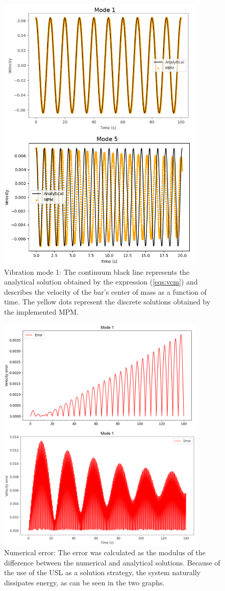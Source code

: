 \documentclass[preprint,12pt]{elsarticle}
\begin{document}
    \begin{figure}
    	\includegraphics[width=10cm]{results.png}
    	\centering
    	\caption{Vibration mode 1: The continuum black line represents the analytical solution obtained by the expression (\ref{eqs:vcm}) and describes the velocity of the bar's center of mass as a function of time. The yellow dots represent the discrete solutions obtained by the implemented MPM.}
    	\label{fig:results}
    \end{figure}
    
    \begin{figure}
    	\includegraphics[width=10cm]{error.png}
    	\centering
    	\caption{Numerical error: The error was calculated as the modulus of the difference between the numerical and analytical solutions. Because of the use of the USL as a solution strategy, the system naturally dissipates energy, as can be seen in the two graphs.}
    	\label{fig:error}
    \end{figure}
    
\end{document}
